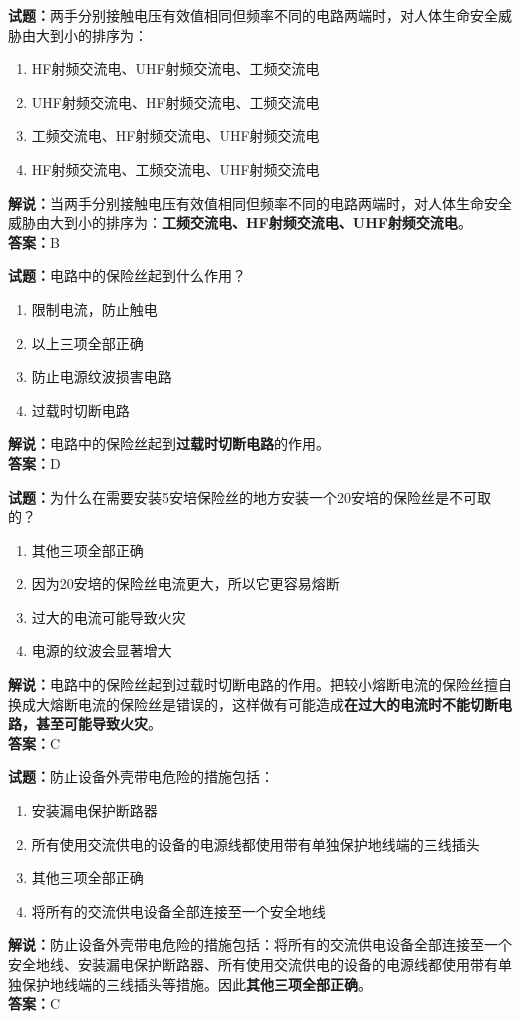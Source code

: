\documentclass{ctexbook}
\begin{document}
\noindent\textbf{试题：}两手分别接触电压有效值相同但频率不同的电路两端时，对人体生命安全威胁由大到小的排序为：
\begin{enumerate}[leftmargin=3em]
	\item HF射频交流电、UHF射频交流电、工频交流电
	\item UHF射频交流电、HF射频交流电、工频交流电
	\item 工频交流电、HF射频交流电、UHF射频交流电
	\item HF射频交流电、工频交流电、UHF射频交流电
\end{enumerate}
\noindent\textbf{解说：}当两手分别接触电压有效值相同但频率不同的电路两端时，对人体生命安全威胁由大到小的排序为：\textbf{工频交流电、HF射频交流电、UHF射频交流电}。\\\noindent\textbf{答案：}B

\bigskip


\noindent\textbf{试题：}电路中的保险丝起到什么作用？
\begin{enumerate}[leftmargin=3em]
	\item 限制电流，防止触电
	\item 以上三项全部正确
	\item 防止电源纹波损害电路
	\item 过载时切断电路
\end{enumerate}
\noindent\textbf{解说：}电路中的保险丝起到\textbf{过载时切断电路}的作用。\\\noindent\textbf{答案：}D
\bigskip


\noindent\textbf{试题：}为什么在需要安装5安培保险丝的地方安装一个20安培的保险丝是不可取的？
\begin{enumerate}[leftmargin=3em]
	\item 其他三项全部正确
	\item 因为20安培的保险丝电流更大，所以它更容易熔断
	\item 过大的电流可能导致火灾
	\item 电源的纹波会显著增大
\end{enumerate}
\noindent\textbf{解说：}电路中的保险丝起到过载时切断电路的作用。把较小熔断电流的保险丝擅自换成大熔断电流的保险丝是错误的，这样做有可能造成\textbf{在过大的电流时不能切断电路，甚至可能导致火灾}。\\\noindent\textbf{答案：}C%

\bigskip


\noindent\textbf{试题：}防止设备外壳带电危险的措施包括：
\begin{enumerate}[leftmargin=3em]
	\item 安装漏电保护断路器
	\item 所有使用交流供电的设备的电源线都使用带有单独保护地线端的三线插头
	\item 其他三项全部正确
	\item 将所有的交流供电设备全部连接至一个安全地线
\end{enumerate}
\noindent\textbf{解说：}防止设备外壳带电危险的措施包括：将所有的交流供电设备全部连接至一个安全地线、安装漏电保护断路器、所有使用交流供电的设备的电源线都使用带有单独保护地线端的三线插头等措施。因此\textbf{其他三项全部正确}。\\\noindent\textbf{答案：}C
\end{document}
